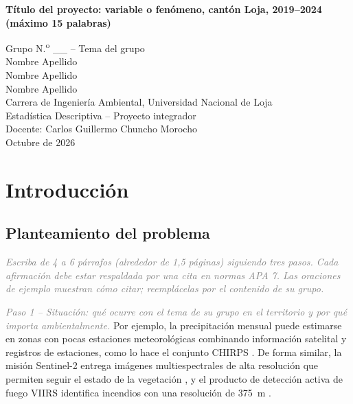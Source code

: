 \documentclass[12pt,a4paper]{article}
\newcommand{\instruccion}[1]{\textcolor{gray}{\textit{#1}}}
\newcommand{\titulo}{Título del proyecto: variable o fenómeno, cantón Loja, 2019--2024 (máximo 15 palabras)}
\newcommand{\grupo}{Grupo N.\textsuperscript{o} \_\_ -- Tema del grupo}
\newcommand{\integrantes}{Nombre Apellido \\ Nombre Apellido \\ Nombre Apellido}
\begin{document}
\begin{titlepage}
\centering
\doublespacing
\vspace*{3cm}
{\bfseries\titulo\par}
\vspace{1.5cm}
\grupo\\[0.4cm]
\integrantes\\[1.2cm]
Carrera de Ingeniería Ambiental, Universidad Nacional de Loja\\
Estadística Descriptiva -- Proyecto integrador\\
Docente: Carlos Guillermo Chuncho Morocho\\
Octubre de 2026
\end{titlepage}

\doublespacing

\section{Introducción}

\subsection{Planteamiento del problema}

\instruccion{Escriba de 4 a 6 párrafos (alrededor de 1,5 páginas) siguiendo tres pasos. Cada afirmación debe estar respaldada por una cita en normas APA 7. Las oraciones de ejemplo muestran cómo citar; reemplácelas por el contenido de su grupo.}

\instruccion{Paso 1 -- Situación: qué ocurre con el tema de su grupo en el territorio y por qué importa ambientalmente.}
Por ejemplo, la precipitación mensual puede estimarse en zonas con pocas estaciones meteorológicas combinando información satelital y registros de estaciones, como lo hace el conjunto CHIRPS \parencite{funk2015}. De forma similar, la misión Sentinel-2 entrega imágenes multiespectrales de alta resolución que permiten seguir el estado de la vegetación \parencite{drusch2012}, y el producto de detección activa de fuego VIIRS identifica incendios con una resolución de 375~m \parencite{schroeder2014}.
\end{document}
